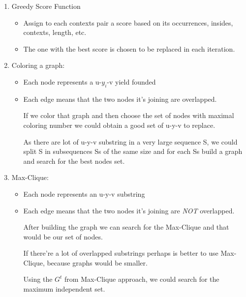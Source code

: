 \begin{enumerate}
	\item Greedy Score Function
	\begin{itemize}
		\item Assign to each contexts pair a score based on its occurrences, insides, contexts, length, etc.
		\item The one with the best score is chosen to be replaced in each iteration.
	\end{itemize}
	\item Coloring a graph: 
	\begin{itemize}

		\item Each node represents a u-$y_i$-v yield founded 

		\item Each edge means that the two nodes it's joining are overlapped.

		If we color that graph and then choose the set of nodes with maximal
		coloring number we could obtain a good set of u-y-v to replace.

		As there are lot of u-y-v substring in a very large sequence S, we
		could split S in subsequences Ss of the same size and for each Ss
		build a graph and search for the best nodes set.
	\end{itemize}

	\item Max-Clique:

	\begin{itemize}

		\item Each node represents an u-y-v substring

		\item Each edge means that the two nodes it's joining are \emph{NOT} overlapped.

		After building the graph we can search for the Max-Clique and that
		would be our set of nodes.

		If there're a lot of overlapped substrings perhaps is better to use	Max-Clique, because graphs would be smaller.

		Using the $G^{t}$ from Max-Clique approach, we could search
		for the maximum independent set. 
	\end{itemize}

\end{enumerate}

